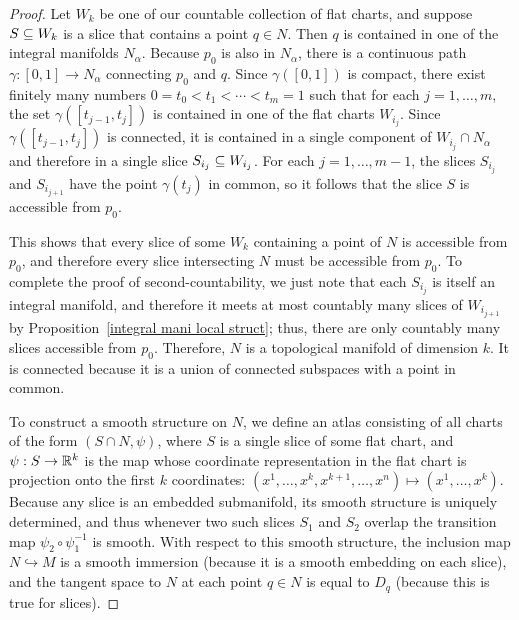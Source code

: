 \begin{proof}
Let $W_k$ be one of our countable collection of flat charts, and suppose $S\subseteq W_k$ is a slice that contains a point $q\in N$. Then $q$ is contained in one of the integral manifolds $N_\alpha$. Because $p_0$ is also in $N_\alpha$, there is a continuous path $\gamma:[0,1]\to N_\alpha$ connecting $p_0$ and $q$. Since $\gamma([0,1])$ is compact, there exist finitely many numbers $0=t_0<t_1<\cdots<t_m=1$ such that for each $j=1,\dots,m$, the set $\gamma([t_{j-1},t_j])$ is contained in one of the flat charts $W_{i_j}$. Since $\gamma([t_{j-1},t_j])$ is connected, it is contained in a single component of $W_{i_j}\cap N_\alpha$ and therefore in a single slice $S_{i_j}\subseteq W_{i_j}$. For each $j=1,\dots,m-1$, the slices $S_{i_j}$ and $S_{i_{j+1}}$ have the point $\gamma(t_j)$ in common, so it follows that the slice $S$ is accessible from $p_0$.\par
This shows that every slice of some $W_k$ containing a point of $N$ is accessible from $p_0$, and therefore every slice intersecting $N$ must be accessible from $p_0$. To complete the proof of second-countability, we just note that each $S_{i_j}$ is itself an integral manifold, and therefore it meets at most countably many slices of $W_{i_{j+1}}$ by Proposition~\ref{integral mani local struct}; thus, there are only countably many slices accessible from $p_0$. Therefore, $N$ is a topological manifold of dimension $k$. It is connected because it is a union of connected subspaces with a point in common.\par
To construct a smooth structure on $N$, we define an atlas consisting of all charts of the form $(S\cap N,\psi)$, where $S$ is a single slice of some flat chart, and $\psi:S\to\mathbb{R}^k$ is the map whose coordinate representation in the flat chart is projection onto the first $k$ coordinates: $(x^1,\dots,x^k,x^{k+1},\dots,x^n)\mapsto(x^1,\dots,x^k)$. Because any slice is an embedded submanifold, its smooth structure is uniquely determined, and thus whenever two such slices $S_1$ and $S_2$ overlap the transition map $\psi_2\circ\psi_1^{-1}$ is smooth. With respect to this smooth structure, the inclusion map $N\hookrightarrow M$ is a smooth immersion (because it is a smooth embedding on each slice), and the tangent space to $N$ at each point $q\in N$ is equal to $D_q$ (because this is true for slices).
\end{proof}
